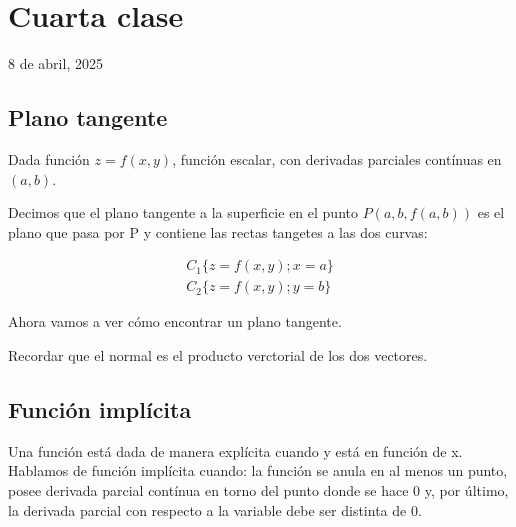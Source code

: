 \section{Cuarta clase}

8 de abril, 2025

\subsection{Plano tangente}

Dada función \(z = f(x,y)\), función escalar,
con derivadas parciales contínuas en \((a,b)\).

Decimos que el plano tangente a la superficie en el punto \(P(a, b, f(a,b))\) es el plano que pasa por P y contiene  las rectas tangetes a las dos curvas:

\begin{align*}    
    C_1 \{z = f(x,y) ; x=a\} \\ C_2 \{z = f(x,y) ; y=b\}
\end{align*}

Ahora vamos a ver cómo encontrar un plano tangente.

Recordar que el normal es el producto verctorial de los dos vectores.

\subsection{Función implícita}

Una función está dada de manera explícita cuando y está en función de x.
Hablamos de función implícita cuando: la función se anula en al menos un punto,
posee derivada parcial contínua en torno del punto donde se hace 0 y,
por último,
la derivada parcial con respecto a la variable debe ser distinta de 0.